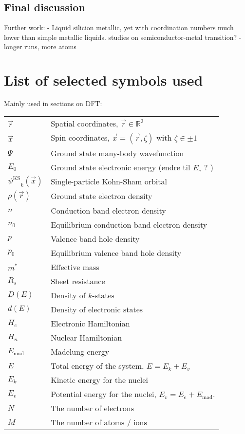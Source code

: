 \documentclass[11pt,bibliography=totoc,index=totoc]{scrbook}   %
\newcommand{\ksorb}{\ensuremath{\psi^{\mathrm{KS}}}}
\begin{document}
%
\section{Final discussion}
%


Further work:
- Liquid silicion metallic\cite{Glazov:1969}, yet with coordination numbers much lower than simple metallic liquids.
 studies on semiconductor-metal transition?
- longer runs, more atoms


\printbibliography

\appendix
\chapter{List of selected symbols used}
  Mainly used in sections on DFT:

  \begin{tabular}{ll}
    $\vec{r}$ & Spatial coordinates, $\vec{r}\in\mathbb{R}^3$ \\
    $\vec{x}$ & Spin coordinates, $\vec{x}=(\vec{r},\zeta)$ with $\zeta\in\pm 1$ \\
    $\Psi$  & Ground state many-body wavefunction \\
    $E_0$   & Ground state electronic energy (endre til $E_e$ ? ) \\
    $\ksorb_k(\vec{x})$  & Single-particle Kohn-Sham orbital \\
    $\rho(\vec{r})$  & Ground state electron density \\
	$n$		& Conduction band electron density \\
	$n_0$	& Equilibrium conduction band electron density \\
	$p$		& Valence band hole density \\
	$p_0$	& Equilibrium valence band hole density \\
	$m^*$	& Effective mass \\
	$R_s$	& Sheet resistance \\
	$D(E)$	& Density of $k$-states \\
	$d(E)$	& Density of electronic states \\
    $H_e$   & Electronic Hamiltonian \\
    $H_n$   & Nuclear Hamiltonian \\
    $E_{\text{mad}}$ & Madelung energy \\
    $E$     & Total energy of the system, $E = E_k + E_v$ \\
    $E_k$   & Kinetic energy for the nuclei \\
    $E_v$   & Potential energy for the nuclei, $E_v = E_e + E_{\text{mad}}$. \\
    $N$     & The number of electrons \\
    $M$     & The number of atoms / ions
  \end{tabular}
\end{document}
